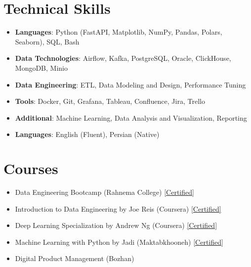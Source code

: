 \documentclass[11pt, a4paper]{article}
\newcommand{\resumeItem}[1]{\item\small{#1 \vspace{-2pt}}}
\newcommand{\resumeSubHeadingListStart}{\begin{itemize}[leftmargin=0.15in, label={}]}
\newcommand{\resumeSubHeadingListEnd}{\end{itemize}}
\begin{document}
\section{Technical Skills}
\resumeSubHeadingListStart
    \resumeItem{\textbf{Languages}: Python (FastAPI, Matplotlib, NumPy, Pandas, Polars, Seaborn), SQL, Bash}
    \resumeItem{\textbf{Data Technologies}: Airflow, Kafka, PostgreSQL, Oracle, ClickHouse, MongoDB, Minio}
    \resumeItem{\textbf{Data Engineering}: ETL, Data Modeling and Design, Performance Tuning}
    \resumeItem{\textbf{Tools}: Docker, Git, Grafana, Tableau, Confluence, Jira, Trello}
    \resumeItem{\textbf{Additional}: Machine Learning, Data Analysis and Visualization, Reporting}
    \resumeItem{\textbf{Languages}: English (Fluent), Persian (Native)}
\resumeSubHeadingListEnd

\section{Courses}
\resumeSubHeadingListStart
    \resumeItem{Data Engineering Bootcamp (Rahnema College)}{\href{https://rahnemacollege.com/certificate/alrzhanifieZtMWLGxcNT5eQ}{[Certified]}}
    \resumeItem{Introduction to Data Engineering by Joe Reis (Coursera)}{\href{https://www.coursera.org/account/accomplishments/verify/CB9QBZITDJEQ}{[Certified]}}
    \resumeItem{Deep Learning Specialization by Andrew Ng (Coursera)}{\href{https://www.coursera.org/account/accomplishments/specialization/EN3BD5D7X97H}{[Certified]}}
    \resumeItem{Machine Learning with Python by Jadi (Maktabkhooneh)}{\href{https://maktabkhooneh.org/certificates/MK-KVBCQB/}{[Certified]}}
    \resumeItem{Digital Product Management (Bozhan)}
\resumeSubHeadingListEnd
\end{document}
